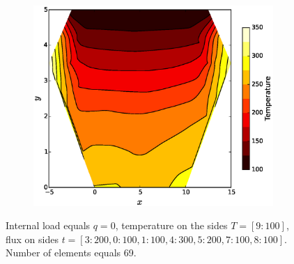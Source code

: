 \documentclass[10pt, a4paper]{article}
\begin{document}
\begin{figure}[H]
\begin{subfigure}[H]{0.33\textwidth}
	\end{subfigure}
	\begin{subfigure}[H]{0.33\textwidth}
		\includegraphics[width=\textwidth]{fig/test3_3.eps}
		\caption{}
		\label{fig:3}
	\end{subfigure}
	\caption{Internal load equals $q=0$, temperature on the sides $T=[9:100]$, flux on sides $t=[3:200, 0:100, 1:100, 4:300, 5:200, 7:100, 8:100]$. Number of elements equals 69.}
	\label{fig:3_1}
\end{figure}
\end{document}
